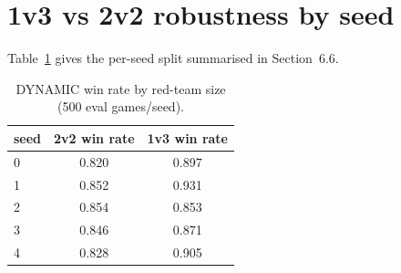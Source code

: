 \documentclass{article}
\begin{document}
\section{1v3 vs 2v2 robustness by seed}
Table~\ref{tab:1v3-appendix} gives the per-seed split summarised in
Section~6.6.

\begin{table}[h]
\centering
\small
\caption{DYNAMIC win rate by red-team size (500 eval games/seed).}
\label{tab:1v3-appendix}
\begin{tabular}{lcc}
\toprule
seed & 2v2 win rate & 1v3 win rate \\
\midrule
0 & 0.820 & 0.897 \\
1 & 0.852 & 0.931 \\
2 & 0.854 & 0.853 \\
3 & 0.846 & 0.871 \\
4 & 0.828 & 0.905 \\
\bottomrule
\end{tabular}
\end{table}
\end{document}
